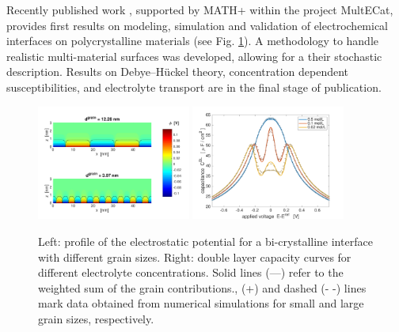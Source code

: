 \documentclass[a4paper,10pt]{article}
\begin{document}
Recently published work \cite{JES}, supported by MATH+ within the project MultECat, provides first results on modeling, simulation and validation of electrochemical interfaces on polycrystalline materials (see Fig. \ref{fig:JES}). A methodology to handle realistic multi-material surfaces was developed, allowing for a their stochastic description. Results on Debye--Hückel theory, concentration dependent susceptibilities, and electrolyte transport are in the final stage of publication. %

\begin{figure}
  \centering
  \includegraphics[width=0.45\textwidth]{AA2x-Fuhrmann-Landstorfer-phi_poly2d_gran.pdf}
  \includegraphics[width=0.45\textwidth]{AA2x-Fuhrmann-Landstorfer-c_2d_grain.pdf}
  \caption{Left: profile of the electrostatic potential for a bi-crystalline interface with different
    grain sizes.
    Right: double layer capacity curves for different electrolyte concentrations.
    Solid lines (—) refer to the weighted sum of the grain contributions.,
    (+) and dashed (- -) lines mark data obtained from numerical simulations for
    small and large grain sizes, respectively.
 \label{fig:JES}}
\end{figure}

\end{document}
